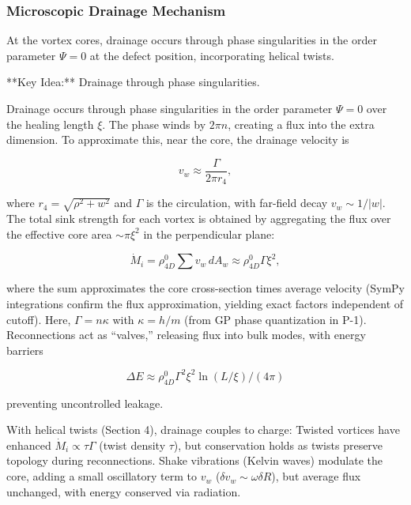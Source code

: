 \subsubsection{Microscopic Drainage Mechanism}
At the vortex cores, drainage occurs through phase singularities in the order parameter $\Psi=0$ at the defect position, incorporating helical twists.

**Key Idea:** Drainage through phase singularities.

Drainage occurs through phase singularities in the order parameter $\Psi=0$ over the healing length $\xi$. The phase winds by $2\pi n$, creating a flux into the extra dimension. To approximate this, near the core, the drainage velocity is

\begin{equation}
v_w \approx \frac{\Gamma}{2\pi r_4},
\end{equation}

where $r_4 = \sqrt{\rho^2 + w^2}$ and $\Gamma$ is the circulation, with far-field decay $v_w \sim 1/|w|$. The total sink strength for each vortex is obtained by aggregating the flux over the effective core area $\sim \pi \xi^2$ in the perpendicular plane:

\begin{equation}
\dot{M}_i = \rho_{4D}^0 \sum v_w \, dA_w \approx \rho_{4D}^0 \Gamma \xi^2,
\end{equation}

where the sum approximates the core cross-section times average velocity (SymPy integrations confirm the flux approximation, yielding exact factors independent of cutoff). Here, $\Gamma = n \kappa$ with $\kappa = h / m$ (from GP phase quantization in P-1). Reconnections act as ``valves,'' releasing flux into bulk modes, with energy barriers

\begin{equation}
\Delta E \approx \rho_{4D}^0 \Gamma^2 \xi^2 \ln(L / \xi) / (4\pi)
\end{equation}

preventing uncontrolled leakage.

With helical twists (Section 4), drainage couples to charge: Twisted vortices have enhanced $\dot{M}_i \propto \tau \Gamma$ (twist density $\tau$), but conservation holds as twists preserve topology during reconnections. Shake vibrations (Kelvin waves) modulate the core, adding a small oscillatory term to $v_w$ ($\delta v_w \sim \omega \delta R$), but average flux unchanged, with energy conserved via radiation.

